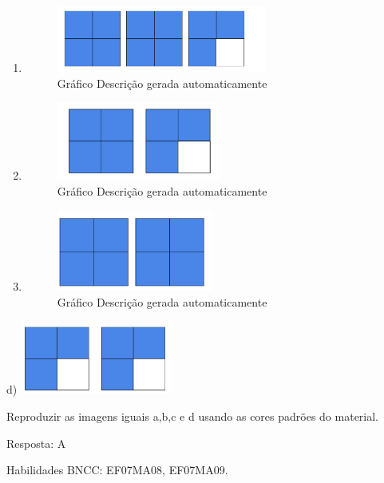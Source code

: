 \begin{enumerate}
\def\labelenumi{\alph{enumi})}
\item
  \begin{figure}
  \centering
  \includegraphics[width=2.70952in,height=0.85605in]{./imgSAEB_7_MAT/media/image12.png}
  \caption{Gráfico Descrição gerada automaticamente}
  \end{figure}
\item
  \begin{figure}
  \centering
  \includegraphics[width=2.12619in,height=1.00858in]{./imgSAEB_7_MAT/media/image13.png}
  \caption{Gráfico Descrição gerada automaticamente}
  \end{figure}
\item
  \begin{figure}
  \centering
  \includegraphics[width=2.01937in,height=1.04937in]{./imgSAEB_7_MAT/media/image14.png}
  \caption{Gráfico Descrição gerada automaticamente}
  \end{figure}
\end{enumerate}

d)
\includegraphics[width=1.98287in,height=0.94874in]{./imgSAEB_7_MAT/media/image15.png}

Reproduzir as imagens iguais a,b,c e d usando as cores padrões do
material.

Resposta: A

Habilidades BNCC: EF07MA08, EF07MA09.

